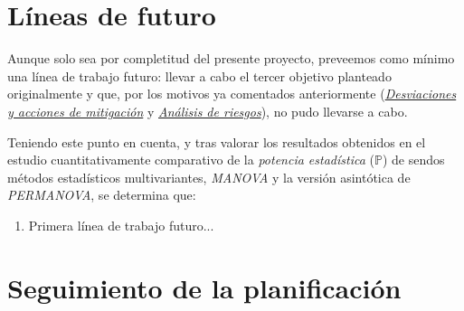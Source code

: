\documentclass[IB,BIB]{TFUOC}%
\begin{document}
\section{Líneas de futuro}
\label{sec:Líneas de futuro}


Aunque solo sea por completitud del presente proyecto, preveemos como mínimo una línea de trabajo futuro: llevar a cabo el tercer objetivo planteado originalmente y que, por los motivos ya comentados anteriormente (\textit{\hyperref[sec:Desviaciones y acciones de mitigación]{Desviaciones y acciones de mitigación}} y \textit{\hyperref[sec:Análisis de riesgos]{Análisis de riesgos}}), no pudo llevarse a cabo.

Teniendo este punto en cuenta, y tras valorar los resultados obtenidos en el estudio cuantitativamente comparativo de la \textit{potencia estadística} (\( \mathbb P \)) de sendos métodos estadísticos multivariantes, \textit{MANOVA} y la versión asintótica de \textit{PERMANOVA}, se determina que:

\begin{enumerate}[label=\textnormal{(\Roman*)}]
\item \label{th1} Primera línea de trabajo futuro...
\end{enumerate}

\section{Seguimiento de la planificación}
\label{sec:Seguimiento de la planificación}

\end{document}
